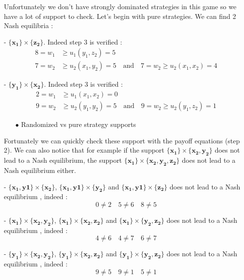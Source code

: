 Unfortunately we don't have strongly dominated strategies in this game so we have a lot of support to check. Let's begin with pure strategies. We can find 2 Nash equilibria :

- $\mathbf{\{x_1\}}\times\mathbf{\{z_2\}}$. Indeed step 3 is verified :
\begin{align*}
    8=w_1&\ge u_1(y_1,z_2)=5   \\
    7=w_2&\ge u_2(x_1,y_2)=5 \quad \mbox{and} \quad 7=w_2\ge u_2(x_1,x_2)=4 
\end{align*}


- $\mathbf{\{y_1\}}\times\mathbf{\{x_2\}}$. Indeed step 3 is verified :
\begin{align*}
    2=w_1&\ge u_1(x_1,x_2)=0 \\
    9=w_2&\ge u_2(y_1,y_2)=5  \quad \mbox{and} \quad  9=w_2\ge u_2(y_1,z_2)=1
\end{align*}

\begin{itemize}
  \item[$\bullet$] Randomized vs pure strategy supports
\end{itemize}

Fortunately we can quickly check these support with the payoff equations (step 2). We can also notice that for example if the support $\mathbf{\{x_1\}}\times\mathbf{\{x_2,y_2\}}$  does not lead to a Nash equilibrium, the support $\mathbf{\{x_1\}}\times\mathbf{\{x_2,y_2,z_2\}}$ does not lead to a Nash equilibrium either. 

- $\mathbf{\{x_1,y1\}}\times\mathbf{\{x_2\}}$, $\mathbf{\{x_1,y1\}}\times\mathbf{\{y_2\}}$ and $\mathbf{\{x_1,y1\}}\times\mathbf{\{z_2\}}$ does not lead to a Nash equilibrium , indeed :
\begin{equation*}
    0\ne2 \quad 5\ne6 \quad 8\ne5
\end{equation*}

- $\mathbf{\{x_1\}}\times\mathbf{\{x_2,y_2\}}$, $\mathbf{\{x_1\}}\times\mathbf{\{x_2,z_2\}}$ and $\mathbf{\{x_1\}}\times\mathbf{\{y_2,z_2\}}$ does not lead to a Nash equilibrium , indeed :
\begin{equation*}
    4\ne6 \quad 4\ne7 \quad 6\ne7
\end{equation*}

- $\mathbf{\{y_1\}}\times\mathbf{\{x_2,y_2\}}$, $\mathbf{\{y_1\}}\times\mathbf{\{x_2,z_2\}}$ and $\mathbf{\{y_1\}}\times\mathbf{\{y_2,z_2\}}$ does not lead to a Nash equilibrium , indeed :
\begin{equation*}
    9\ne5 \quad 9\ne1 \quad 5\ne1
\end{equation*}


